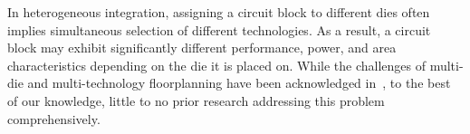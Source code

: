 In heterogeneous integration, assigning a circuit block to different dies often implies simultaneous selection of different technologies. As a result, a circuit block may exhibit significantly different performance, power, and area characteristics depending on the die it is placed on. While the challenges of multi-die and multi-technology floorplanning have been acknowledged in~\cite{chang2024multidieChallenges}, to the best of our knowledge, little to no prior research addressing this problem comprehensively.









